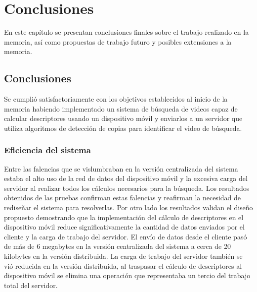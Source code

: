 
\chapter{Conclusiones}
En este capítulo se presentan conclusiones finales sobre el trabajo realizado en la memoria, así como propuestas de trabajo futuro y posibles extensiones a la memoria.

\section{Conclusiones}

Se cumplió satisfactoriamente con los objetivos establecidos al inicio de la memoria habiendo implementado un sistema de búsqueda de videos capaz de calcular descriptores usando un dispositivo móvil y enviarlos a un servidor que utiliza algoritmos de detección de copias para identificar el video de búsqueda.

\subsection*{Eficiencia del sistema}
Entre las falencias que se vislumbraban en la versión centralizada del sistema estaba el alto uso de la red de datos del dispositivo móvil y la excesiva carga del servidor al realizar todos los cálculos necesarios para la búsqueda. Los resultados obtenidos de las pruebas confirman estas falencias y reafirman la necesidad de rediseñar el sistema para resolverlas. Por otro lado los resultados validan el diseño propuesto demostrando que la implementación del cálculo de descriptores en el dispositivo móvil reduce significativamente la cantidad de datos enviados por el cliente y la carga de trabajo del servidor. El envío de datos desde el cliente pasó de más de 6 megabytes en la versión centralizada del sistema a cerca de 20 kilobytes en la versión distribuida. La carga de trabajo del servidor también se vió reducida en la versión distribuida, al traspasar el cálculo de descriptores al dispositivo móvil se elimina una operación que representaba un tercio del trabajo total del servidor.

